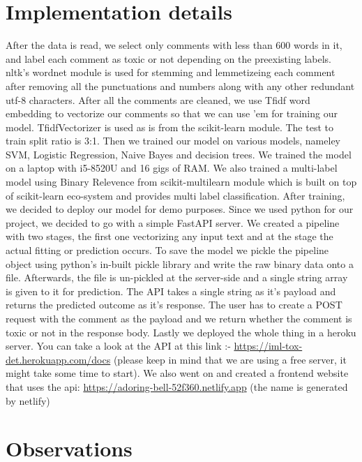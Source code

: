\documentclass[11pt]{article}
\begin{document}
\section{Implementation details}
After the data is read, we select only comments with less than 600 words in it, and label each comment as toxic or not depending on the preexisting labels. nltk's wordnet module is used for stemming and lemmetizeing each comment after removing all the punctuations and numbers along with any other redundant utf-8 characters. After all the comments are cleaned, we use Tfidf word embedding to vectorize our comments so that we can use 'em for training our model. TfidfVectorizer is used as is from the scikit-learn module. The test to train split ratio is 3:1. Then we trained our model on various models, nameley SVM, Logistic Regression, Naive Bayes and decision trees. We trained the model on a laptop with i5-8520U and 16 gigs of RAM. We also trained a multi-label model using Binary Relevence from scikit-multilearn module which is built on top of scikit-learn eco-system and provides multi label classification. After training, we decided to deploy our model for demo purposes. Since we used python for our project, we decided to go with a simple FastAPI server. We created a pipeline with two stages, the first one vectorizing any input text and at the stage the actual fitting or prediction occurs. To save the model we pickle the pipeline object using python's in-built pickle library and write the raw binary data onto a file. Afterwards, the file is un-pickled at the server-side and a single string array is given to it for prediction. The API takes a single string as it's payload and returns the predicted outcome as it's response. The user has to create a POST request with the comment as the payload and we return whether the comment is toxic or not in the response body. Lastly we deployed the whole thing in a heroku server. You can take a look at the API at this link :- \url{https://iml-tox-det.herokuapp.com/docs} (please keep in mind that we are using a free server, it might take some time to start). We also went on and created a frontend website that uses the api: \url{https://adoring-bell-52f360.netlify.app} (the name is generated by netlify)
\section{Observations}
\end{document}
